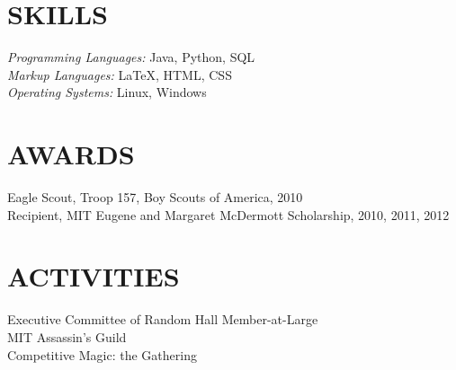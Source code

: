 \documentclass[margin]{res}
\begin{document}
\begin{resume}
\section{SKILLS} {\sl Programming Languages:} Java, Python, SQL \\
                 {\sl Markup Languages:} \LaTeX, HTML, CSS \\
                 {\sl Operating Systems:} Linux, Windows
 
 
\section{AWARDS} Eagle Scout, Troop 157, Boy Scouts of America, 2010\\
        Recipient, MIT Eugene and Margaret McDermott Scholarship, 2010, 2011,
        2012

\section{ACTIVITIES}             
        Executive Committee of Random Hall Member-at-Large \\
        MIT Assassin's Guild \\
        Competitive Magic: the Gathering
 

\end{resume}
\end{document}
